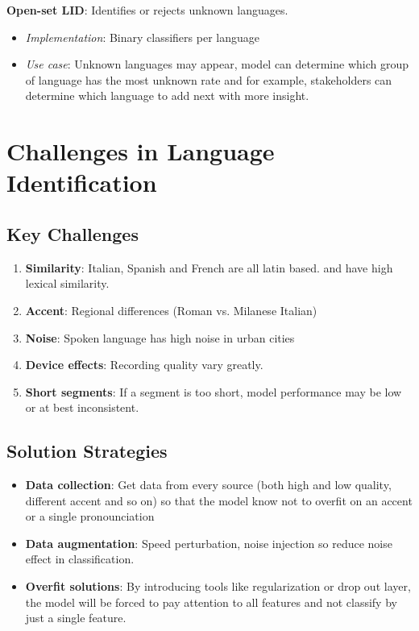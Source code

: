 \documentclass[12pt,a4paper]{article}
\begin{document}
	\textbf{Open-set LID}: Identifies or rejects unknown languages.
	\begin{itemize}
		\item \textit{Implementation}: Binary classifiers per language 
		\item \textit{Use case}: Unknown languages may appear, model can determine which group of language has the most unknown rate and for example, stakeholders can determine which language to add next with more insight.
	\end{itemize}
	
	\section{Challenges in Language Identification}
	
	\subsection{Key Challenges}
	\begin{enumerate}
		\item \textbf{Similarity}: Italian, Spanish and French are all latin based. and have high lexical similarity.
		\item \textbf{Accent}: Regional differences (Roman vs. Milanese Italian)
		\item \textbf{Noise}: Spoken language has high noise in urban cities
		\item \textbf{Device effects}: Recording quality vary greatly.
		\item \textbf{Short segments}: If a segment is too short, model performance may be low or at best inconsistent. 
		
		
	\end{enumerate}
	
	\subsection{Solution Strategies}
	\begin{itemize}
		\item \textbf{Data collection}: Get data from every source (both high and low quality, different accent and so on) so that the model know not to overfit on an accent or a single pronounciation
		\item \textbf{Data augmentation}: Speed perturbation, noise injection so reduce noise effect in classification.
		\item \textbf{Overfit solutions}: By introducing tools like regularization or drop out layer, the model will be forced to pay attention to all features and not classify by just a single feature.
	\end{itemize}
	
\end{document}
